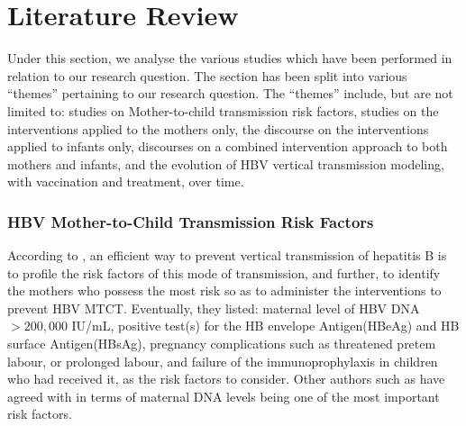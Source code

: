 \chapter{Literature Review}
\label{chp:LIT}
Under this section, we analyse the various studies which have been performed in relation to our research question.  The section has been split into various ``themes'' pertaining to our research question. The ``themes'' include, but are not limited to: studies on Mother-to-child transmission risk factors, studies on the interventions applied to the mothers only, the discourse on the interventions applied to infants only, discourses on a combined intervention approach to both mothers and infants, and the evolution of HBV vertical transmission modeling, with vaccination and treatment, over time.


\subsection{HBV Mother-to-Child Transmission Risk Factors}
According to  \cite{Pan2012}, an efficient way to prevent vertical transmission of hepatitis B is to profile the risk factors of this mode of transmission, and further, to identify the mothers who possess the most risk so as to administer the interventions to prevent HBV MTCT. Eventually, they listed: maternal level of HBV DNA $>200,000$ IU/mL, positive test(s) for the HB envelope Antigen(HBeAg) and HB surface Antigen(HBsAg), pregnancy complications such as threatened pretem labour, or prolonged labour, and failure of the immunoprophylaxis in children who had received it, as the risk factors to consider. Other authors such as \cite{wen2013mother} have agreed with \cite{Pan2012} in terms of maternal DNA levels being one of the most important risk factors. 





